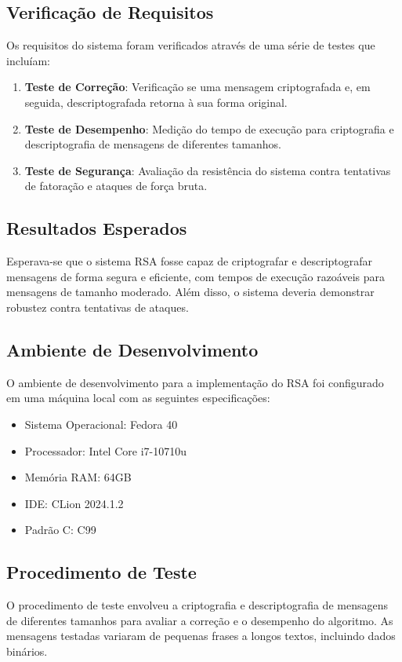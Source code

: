 \documentclass[a4paper,12pt]{article}
\begin{document}
\subsection*{Verificação de Requisitos}
Os requisitos do sistema foram verificados através de uma série de testes que incluíam:

\begin{enumerate}
    \item \textbf{Teste de Correção}: Verificação se uma mensagem criptografada e, em seguida, descriptografada retorna à sua forma original.
    \item \textbf{Teste de Desempenho}: Medição do tempo de execução para criptografia e descriptografia de mensagens de diferentes tamanhos.
    \item \textbf{Teste de Segurança}: Avaliação da resistência do sistema contra tentativas de fatoração e ataques de força bruta.
\end{enumerate}

\subsection*{Resultados Esperados}
Esperava-se que o sistema RSA fosse capaz de criptografar e descriptografar mensagens de forma segura e eficiente, com tempos de execução razoáveis para mensagens de tamanho moderado. Além disso, o sistema deveria demonstrar robustez contra tentativas de ataques.

\subsection*{Ambiente de Desenvolvimento}
O ambiente de desenvolvimento para a implementação do RSA foi configurado em uma máquina local com as seguintes especificações:
\begin{itemize}
    \item Sistema Operacional: Fedora 40
    \item Processador: Intel Core i7-10710u
    \item Memória RAM: 64GB
    \item IDE: CLion 2024.1.2
    \item Padrão C: C99
\end{itemize}

\subsection*{Procedimento de Teste}
O procedimento de teste envolveu a criptografia e descriptografia de mensagens de diferentes tamanhos para avaliar a correção e o desempenho do algoritmo. As mensagens testadas variaram de pequenas frases a longos textos, incluindo dados binários.
\end{document}
